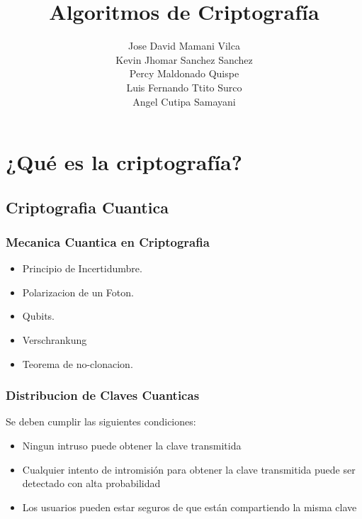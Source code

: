 \documentclass[11pt, conference]{IEEEtran}
\begin{document}
\title{\bf Algoritmos de Criptografía}
\author{Jose David Mamani Vilca\\
	Kevin Jhomar Sanchez Sanchez\\
	Percy Maldonado Quispe\\
	Luis Fernando Ttito Surco\\
	Angel Cutipa Samayani
	}
\maketitle

\section{\bf ¿Qué es la criptografía?}

\subsection{\bf Criptografia Cuantica}
\subsubsection{\bf Mecanica Cuantica en Criptografia}

\begin{itemize}
\item Principio de Incertidumbre. 
\item Polarizacion de un Foton.
\item Qubits.
\item Verschrankung
\item Teorema de no-clonacion.
\end{itemize} 

\subsubsection{\bf Distribucion de Claves Cuanticas}
Se deben cumplir las siguientes condiciones:

\begin{itemize}
\item Ningun intruso puede obtener la clave transmitida 
\item Cualquier intento de intromisión para obtener la clave transmitida puede ser detectado con alta probabilidad
\item Los usuarios pueden estar seguros de que están compartiendo la misma clave
\end{itemize}
\end{document}
